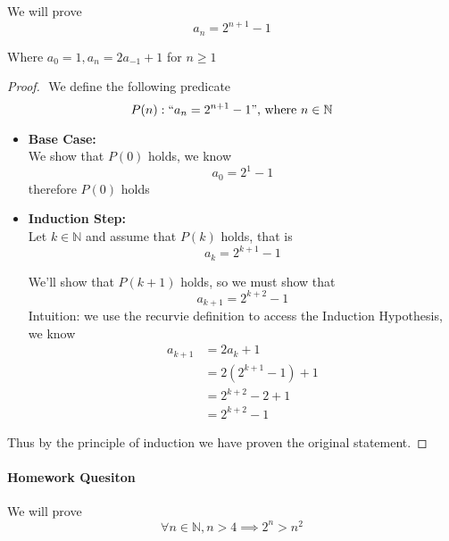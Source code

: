 \documentclass[11pt]{book}
\begin{document}

We will prove 
\[
a_{n} = 2^{n + 1}  - 1
\]

Where $a_{0} = 1, a_{n} = 2a_{ - 1}  + 1$ for $n\ge 1$  

\begin{proof}
    $ $\newline
    We define the following predicate
    \[
    P(n): `` a_{n} = 2^{n + 1}  - 1 "\text{, where } n \in \mathbb{N} 
    \]
    \begin{itemize}
        \item \textbf{Base Case:}\\
            We show that $P(0)$ holds, we know 
            \[
            a_{0} = 2^{1}  - 1
            \]
            therefore $P\left(0\right) $ holds 
        \item \textbf{Induction Step:}\\
            Let $k \in \mathbb{N}$ and assume that $P(k)$ holds, that is 
            \[
            a_{k} = 2^{k + 1}  - 1
            \]
            
            We'll show that $P(k + 1)$ holds, so we must show that 
            \[
            a_{k + 1} = 2^{k + 2}  - 1
            \]
            Intuition: we use the recurvie definition to access the Induction Hypothesis, we know 
            \begin{align*}
                a_{k + 1} &= 2a_{k}  + 1  \\ 
                &= 2\left( 2^{k + 1}  - 1 \right)  + 1  \\ 
                &= 2^{k + 2}  - 2  + 1\\
                &= 2^{k + 2}  - 1 
            \end{align*}
    \end{itemize}
    Thus by the principle of induction we have proven the original statement.
\end{proof}

\paragraph{Homework Quesiton}
We will prove 
\[
\forall n \in \mathbb{N} , n > 4 \implies 2^{n} > n^2 
\]
\end{document}
